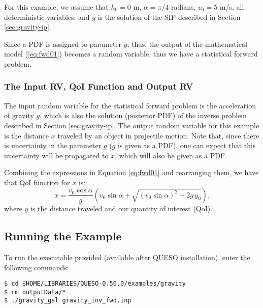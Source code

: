 For this example, we assume that $h_0 =0$ m, $\alpha = \pi/4$ radians, $v_0 = 5$ m/s, all deterministic variables; and $g$ is the solution of the SIP described in Section \ref{sec:gravity-ip}.

Since a PDF is assigned to parameter $g$; thus, the output of the mathematical model (\ref{eq:fwd01}) becomes a random variable, thus we have a statistical forward problem. 

\subsubsection{The Input RV, QoI Function and Output RV}
 
The input random variable for the statistical forward problem is the acceleration of gravity $g$, which is also the solution (posterior PDF) of the inverse problem described in Section \ref{sec:gravity-ip}. The output random variable for this example is the distance $x$ traveled by an object in projectile motion. Note that, since there is uncertainty in the parameter $g$ ($g$ is given as a PDF), one can expect that this uncertainty will be propagated to $x$, which will also be given as a PDF.

Combining the expressions in Equation \ref{eq:fwd01} and rearranging them, we have that QoI function for $x$ %
is: 
\begin{equation}\label{eq:fp_deterministic}
x=\dfrac{ v_0 \cos \alpha }{g} \left( v_0  \sin \alpha  + \sqrt{ ( v_0  \sin \alpha)^2 + 2g\, y_0 }\right).                                                                                        
\end{equation}
where $y$ is the distance traveled and our quantity of interest (QoI). 



\subsection{Running the Example}\label{sec:gravity-run}
 
To run the executable provided (available after QUESO installation), enter the following commands:
\begin{lstlisting}[label={},caption={}]
$ cd $HOME/LIBRARIES/QUESO-0.50.0/examples/gravity
$ rm outputData/*
$ ./gravity_gsl gravity_inv_fwd.inp
\end{lstlisting}

